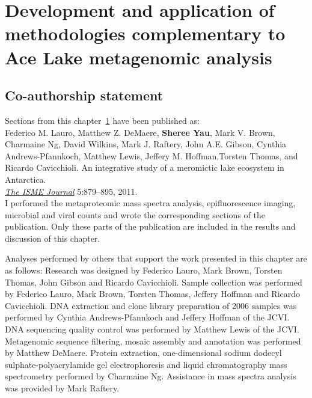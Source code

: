 \chapter[Development and application of methodologies complementary to Ace Lake metagenomic analysis]{Development and application of methodologies complementary to Ace Lake metagenomic analysis}
\label{ch:ace}
\acresetall

\section*{Co-authorship statement}

Sections from this chapter~\ref{ch:ace} have been published as:\\

Federico M. Lauro, Matthew Z. DeMaere, \textbf{Sheree Yau}, Mark V. Brown, Charmaine Ng,
David Wilkins, Mark J. Raftery, John A.E. Gibson, Cynthia Andrews-Pfannkoch, Matthew Lewis,
Jeffery M. Hoffman,Torsten Thomas, and Ricardo Cavicchioli. 
An integrative study of a meromictic lake ecosystem in Antarctica.\\
\emph{\underline{The ISME Journal}} 
5:879--895, 2011.\\

I performed the metaproteomic mass spectra analysis, epifluorescence imaging,
microbial and viral counts and wrote the corresponding sections of the publication.
Only these parts of the publication are included in the results and discussion of this chapter.

Analyses performed by others that support the work presented in this chapter are as follows:
Research was designed by Federico Lauro, Mark Brown, Torsten Thomas, John Gibson and Ricardo Cavicchioli.
Sample collection was performed by Federico Lauro, Mark Brown, Torsten Thomas, Jeffery Hoffman and Ricardo Cavicchioli.
\textsc{DNA} extraction and clone library preparation of 2006 samples was performed by Cynthia Andrews-Pfannkoch and Jeffery Hoffman of the \ac{JCVI}.
\textsc{DNA} sequencing quality control was performed by Matthew Lewis of the \ac{JCVI}.
Metagenomic sequence filtering, mosaic assembly and annotation was performed by Matthew DeMaere.
Protein extraction, one-dimensional sodium dodecyl sulphate-polyacrylamide gel electrophoresis and liquid chromatography mass spectrometry performed by Charmaine Ng.
Assistance in mass spectra analysis was provided by Mark Raftery.
\newpage


